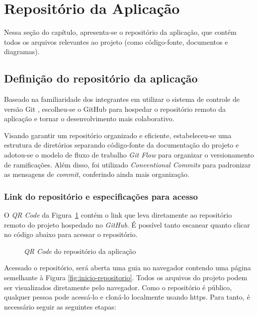 \section{Repositório da Aplicação}

Nessa seção do capítulo, apresenta-se o repositório da aplicação, que contém todos os arquivos relevantes ao projeto (como código-fonte, documentos e diagramas).

\subsection{Definição do repositório da aplicação}

Baseado na familiaridade dos integrantes em utilizar o sistema de controle de versão Git \cite{git-2025}, escolheu-se o GitHub \cite{github-2025} para hospedar o repositório remoto da aplicação e tornar o desenvolvimento mais colaborativo.

Visando garantir um repositório organizado e eficiente, estabeleceu-se uma estrutura de diretórios separando código-fonte da documentação do projeto e adotou-se o modelo de fluxo de trabalho \textit{Git Flow} \cite{gitflow-2023} para organizar o versionamento de ramificações. Além disso, foi utilizado \textit{Conventional Commits} \cite{convcommits-2025} para padronizar as mensagens de \textit{commit}, conferindo ainda mais organização.

\subsubsection{Link do repositório e especificações para acesso}

O \emph{QR Code} da Figura~\ref{fig:qrcode-repositorio} contém o link que leva diretamente ao repositório remoto do projeto hospedado no \emph{GitHub}. É possível tanto escanear quanto clicar no código abaixo para acessar o repositório.

\begin{figure}[h]
	\centering
		\caption{\emph{QR Code} do repositório da aplicação}
		\label{fig:qrcode-repositorio}
\end{figure}

Acessado o repositório, será aberta uma guia no navegador contendo uma página semelhante à Figura \ref{fig:inicio-repositorio}. Todos os arquivos do projeto podem ser visualizados diretamente pelo navegador. Como o repositório é público, qualquer pessoa pode acessá-lo e cloná-lo localmente usando \gls{https}. Para tanto, é necessário seguir as seguintes etapas:
 

